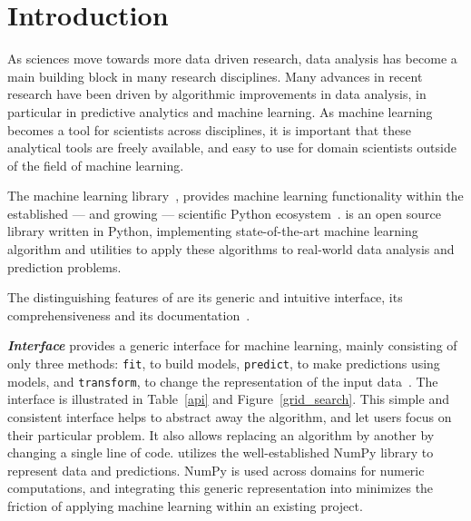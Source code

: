 




\setcounter{section}{0}
\section{Introduction}
As sciences move towards more data driven research, data analysis has
become a main building block in many research disciplines.
Many advances in recent research have been driven by algorithmic improvements
in data analysis, in particular in predictive analytics and machine learning.
As machine learning becomes a tool for scientists across disciplines, it is
important that these analytical tools are freely available, and easy to use for
domain scientists outside of the field of machine learning.


The \sklearn{} machine learning library~\autocite{pedregosa2011scikit},
provides machine learning functionality within the established --- and growing
--- scientific Python ecosystem~\autocite{benlorica, infoworld}.  \sklearn{} is
an open source library written in Python, implementing state-of-the-art machine
learning algorithm and utilities to apply these algorithms to real-world data
analysis and prediction problems.

The distinguishing features of \sklearn{} are its generic and intuitive
interface, its comprehensiveness and its
documentation~\autocite{Varoquaux_2015, benlorica}.

\emph{\textbf{Interface}} \sklearn{} provides a generic interface for machine
learning, mainly consisting of only three methods: \texttt{fit}, to build
models, \texttt{predict}, to make predictions using models, and
\texttt{transform}, to change the representation of the input
data~\autocite{buitinck2013api}.  The interface is illustrated in
Table~\ref{api} and Figure~\ref{grid_search}.  This simple and consistent
interface helps to abstract away the algorithm, and let users focus on their
particular problem. It also allows replacing an algorithm by another by
changing a single line of code. \sklearn{} utilizes the well-established NumPy library to represent data and
predictions.  NumPy is used across domains for numeric computations, and
integrating this generic representation into \sklearn{} minimizes the friction
of applying machine learning within an existing project.

